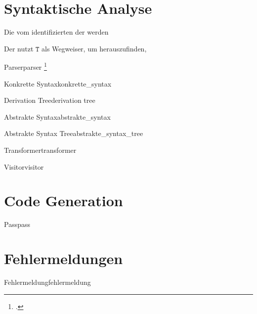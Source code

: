 \section{Syntaktische Analyse}

Die vom  identifizierten  der  werden

Der  nutzt  $\mathtt{T}$ als Wegweiser, um herauszufinden,


\begin{Definition}{Parser}{parser}
\footcite{noauthor_what_nodate}
\end{Definition}

\begin{Definition}{Konkrette Syntax}{konkrette_syntax}
\end{Definition}

\begin{Definition}{Derivation Tree}{derivation tree}
\end{Definition}

\begin{Definition}{Abstrakte Syntax}{abstrakte_syntax}
\end{Definition}

\begin{Definition}{Abstrakte Syntax Tree}{abstrakte_syntax_tree}
\end{Definition}

\begin{Definition}{Transformer}{transformer}
\end{Definition}

\begin{Definition}{Visitor}{visitor}
\end{Definition}

\section{Code Generation}
\begin{Definition}{Pass}{pass}
\end{Definition}
\section{Fehlermeldungen}
\begin{Definition}{Fehlermeldung}{fehlermeldung}
\end{Definition}
